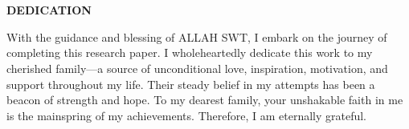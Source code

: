 \newenvironment{dedication}
{%
    \thispagestyle{empty}%
    \vspace*{\stretch{1}}%
    \centering
    \justifying      %
}
{\par %
    \vspace{\stretch{3}} %
    \clearpage           %
}

\chapter*{}
\begin{dedication}
    \begin{center}
        {\textbf{DEDICATION}}
    \end{center}
    With the guidance and blessing of ALLAH SWT, I embark on the journey of
    completing this research paper. I wholeheartedly dedicate this work to my cherished
    family---a source of unconditional love, inspiration, motivation, and support
    throughout my life. Their steady belief in my attempts has been
    a beacon of strength and hope. To my dearest family, your unshakable faith in me
    is the mainspring of my achievements. Therefore, I am eternally grateful.
\end{dedication}
